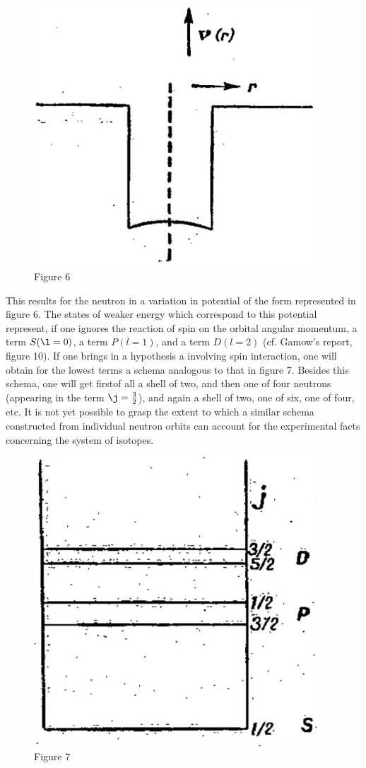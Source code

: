 \documentclass{article}
\newcommand{\orbit}[1]{#1}
\begin{document}
\begin{figure}[h!]
\centering
\includegraphics[width=300pt]{images/fig6}
{\caption*{Figure 6}}
\end{figure}

This results for the neutron in a variation in potential of the form represented in figure 6. The states of weaker energy which correspond to this potential represent, if one ignores the reaction of spin on the orbital angular momentum, a term $\orbit{S}(\l=0)$, a term $\orbit{P}(l=1)$, and a term $\orbit{D}(l=2)$ (cf. Gamow's report, figure 10). If one brings in a hypothesis a involving spin interaction, one will obtain for the lowest terms a schema analogous to that in figure 7. Besides this schema, one will get firstof all a shell of two, and then one of four neutrons (appearing in the term $\j = \frac{3}{2}$), and again a shell of two, one of six, one of four, etc. It is not yet possible to grasp the extent to which a similar schema constructed from individual neutron orbits can account for the experimental facts concerning the system of isotopes.

\begin{figure}[h!]
\centering
\includegraphics[width=300pt]{images/fig7}
{\caption*{Figure 7}}
\end{figure}
\end{document}
